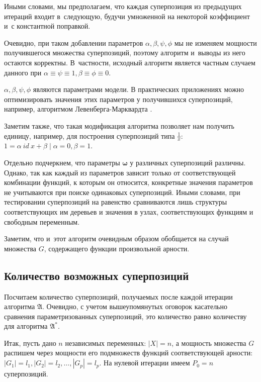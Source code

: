 \documentclass[12pt,a4paper]{article}
\begin{document}
Иными словами, мы предполагаем, что каждая суперпозиция из предыдущих итераций
входит в~следующую, будучи умноженной на некоторой коэффициент и~с константной
поправкой.

Очевидно, при таком добавлении параметров $\alpha, \beta, \psi, \phi$
мы не изменяем мощности получившегося множества суперпозиций, поэтому
алгоритм и~выводы из него остаются корректны. В~частности, исходный алгоритм
является частным случаем данного при
$\alpha \equiv \psi \equiv 1, \beta \equiv \phi \equiv 0$.

$\alpha, \beta, \psi, \phi$ являются параметрами модели. В
практических приложениях можно оптимизировать значения этих параметров у
получившихся суперпозиций, например, алгоритмом Левенберга-Марквардта
\cite{Marquardt1963Algorithm, more:78}.

Заметим также, что такая модификация алгоритма позволяет нам получить единицу,
например, для построения суперпозиций типа $\frac{1}{x}$:
$1 = \alpha\ id\ x + \beta \mid \alpha = 0, \beta = 1$.

Отдельно подчеркнем, что параметры $\boldsymbol{\omega}$ у различных
суперпозиций различны. Однако, так как каждый из параметров зависит только
от соответствующей комбинации функций, к которым он относится, конкретные
значения параметров не учитываются при поиске одинаковых суперпозиций.
Иными словами, при тестировании суперпозиций на равенство сравниваются лишь
структуры соответствующих им деревьев и значения в узлах, соответствующих
функциям и свободным переменным.

Заметим, что и~этот алгоритм очевидным образом обобщается на случай
множества $G$, содержащего функции произвольной арности.

\subsection{Количество возможных суперпозиций}

Посчитаем количество суперпозиций, получаемых после каждой итерации алгоритма
$\mathfrak{A}$. Очевидно, с учетом вышеупомянутых оговорок касательно сравнения
параметризованных суперпозиций, это количество равно количеству для алгоритма
$\mathfrak{A^*}$.

Итак, пусть дано $n$ независимых переменных: $| X | = n$, а мощность
множества $G$ распишем через мощности его подмножеств функций соответствующей
арности: $| G_1 | = l_1, | G_2 | = l_2, \dots, | G_p | = l_p$. На нулевой
итерации имеем $P_0 = n$ суперпозиций.
\end{document}
